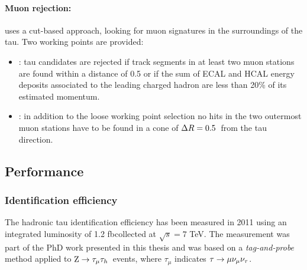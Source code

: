 \paragraph{Muon rejection:} uses a cut-based approach, looking for muon signatures in the surroundings of the tau. Two working points are provided:

\begin{itemize}
\item {}: tau candidates are rejected if track segments in at least two muon stations are found within a \DR distance of 0.5 or if the sum of ECAL and HCAL energy deposits associated to the leading charged hadron are less than 20\% of its estimated momentum.
\item {}: in addition to the loose working point selection no hits in the two outermost muon stations have to be found in a cone of $\Delta R = 0.5$\ from the tau direction.
\end{itemize}

\subsection{Performance}

\subsubsection{Identification efficiency}
\label{sec:tauid_eff}
The hadronic tau identification efficiency has been measured in 2011 using an integrated luminosity of 1.2 fb\Inv collected at $\sqrt{s}=7$ TeV. 
The measurement was part of the PhD work presented in this thesis and was based on a \emph{tag-and-probe} method applied to $\mathrm{Z}\rightarrow\tau_\mu\tau_h$\ events, where $\tau_\mu$ indicates $\tau\rightarrow\mu\nu_\mu\nu_\tau$. 

